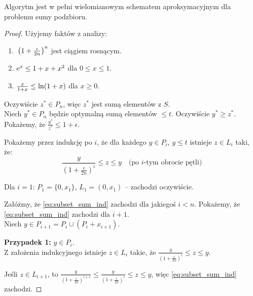 \begin{theorem}
	Algorytm \textnormal{} jest w pełni wielomianowym schematem aproksymacyjnym dla problemu sumy podzbioru.
\end{theorem}

\begin{proof}
	Użyjemy faktów z analizy:
	\begin{enumerate}[nosep, label=\textbf{Fakt \arabic*}, ref=\arabic*, leftmargin=*, labelsep=1em]
		\item \label{fakt:rosnacy} $\vphantom{\left(1 + \frac{\epsilon}{2n}\right)^n} \left(1 + \frac{\epsilon}{2n}\right)^n$ jest ciągiem rosnącym.
		\item \label{fakt:exp} $\vphantom{\left(1 + \frac{\epsilon}{2n}\right)^n} e^x \le 1 + x + x^2$ dla $0 \le x \le 1$.
		\item \label{fakt:ln} $\vphantom{\left(1 + \frac{\epsilon}{2n}\right)^n} \frac{x}{1+x} \le \ln(1+x)$ dla $x \ge 0$.
	\end{enumerate}

	Oczywiście $z^* \in P_n$, więc $z^*$ jest sumą elementów z $S$. \\
	Niech $y^* \in P_n$ będzie optymalną sumą elementów $\le t$. 
	Oczywiście $y^* \ge z^*$. Pokażemy, że $\frac{y^*}{z^*} \le 1 + \epsilon$.

	Pokażemy przez indukcję po $i$, że dla każdego $y \in P_i$, $y \le t$ istnieje $z \in L_i$ taki, że:
	\begin{equation} \label{eq:subset_sum_ind}
		\frac{y}{\left(1 + \frac{\epsilon}{2n}\right)^i} \le z \le y \quad \text{(po $i$-tym obrocie pętli)}
	\end{equation}

	Dla $i = 1$: $P_1 = \{0, x_1\}$, $L_1 = (0, x_1)$ -- zachodzi oczywiście.

	Załóżmy, że \eqref{eq:subset_sum_ind} zachodzi dla jakiegoś $i < n$. Pokażemy, że \eqref{eq:subset_sum_ind} zachodzi dla $i + 1$. \\
	Niech $y \in P_{i+1} = P_i \cup (P_i + x_{i+1})$.

	\textbf{Przypadek 1:} $y \in P_i$. \\
	Z założenia indukcyjnego istnieje $z \in L_i$ takie, że $\frac{y}{\left(1+\frac{\epsilon}{2n}\right)^i} \le z \le y$.

	Jeśli $z \in L_{i+1}$, to $\frac{y}{\left(1+\frac{\epsilon}{2n}\right)^{i+1}} \le \frac{y}{\left(1+\frac{\epsilon}{2n}\right)^i} \le z \le y$, więc \eqref{eq:subset_sum_ind} zachodzi.


\end{proof}
